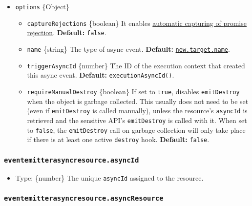 \begin{itemize}
\tightlist
\item
  \texttt{options} \{Object\}

  \begin{itemize}
  \tightlist
  \item
    \texttt{captureRejections} \{boolean\} It enables
    \hyperref[capture-rejections-of-promises]{automatic capturing of
    promise rejection}. \textbf{Default:} \texttt{false}.
  \item
    \texttt{name} \{string\} The type of async event. \textbf{Default:}
    \href{https://developer.mozilla.org/en-US/docs/Web/JavaScript/Reference/Operators/new.target}{\texttt{new.target.name}}.
  \item
    \texttt{triggerAsyncId} \{number\} The ID of the execution context
    that created this async event. \textbf{Default:}
    \texttt{executionAsyncId()}.
  \item
    \texttt{requireManualDestroy} \{boolean\} If set to \texttt{true},
    disables \texttt{emitDestroy} when the object is garbage collected.
    This usually does not need to be set (even if \texttt{emitDestroy}
    is called manually), unless the resource's \texttt{asyncId} is
    retrieved and the sensitive API's \texttt{emitDestroy} is called
    with it. When set to \texttt{false}, the \texttt{emitDestroy} call
    on garbage collection will only take place if there is at least one
    active \texttt{destroy} hook. \textbf{Default:} \texttt{false}.
  \end{itemize}
\end{itemize}

\subsubsection{\texorpdfstring{\texttt{eventemitterasyncresource.asyncId}}{eventemitterasyncresource.asyncId}}\label{eventemitterasyncresource.asyncid}

\begin{itemize}
\tightlist
\item
  Type: \{number\} The unique \texttt{asyncId} assigned to the resource.
\end{itemize}

\subsubsection{\texorpdfstring{\texttt{eventemitterasyncresource.asyncResource}}{eventemitterasyncresource.asyncResource}}\label{eventemitterasyncresource.asyncresource}

